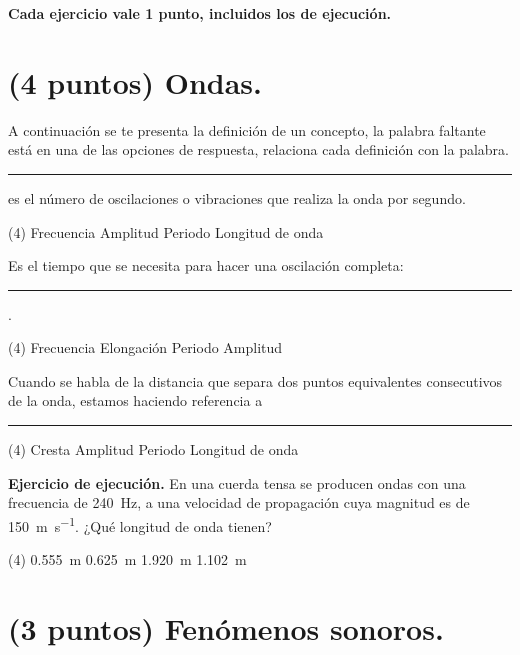 \documentclass[12pt, letter]{exam}
\begin{document}

\setcounter{page}{3}

\newpage
\begin{center}
\textbf{Cada ejercicio vale 1 punto, incluidos los de ejecución.}
\end{center}

\begin{questions}

    \section{(4 puntos) Ondas.}
    
    \vbox{\leftskip\leftmargin A continuación se te presenta la definición de un concepto, la palabra faltante está en una de las opciones de respuesta, relaciona cada definición con la palabra.}

    \question \rule{2cm}{0.1mm} es el número de oscilaciones o vibraciones que realiza la onda por segundo.
    \begin{tasks}(4)
        \task Frecuencia
        \task Amplitud
        \task Periodo
        \task Longitud de onda
    \end{tasks}
    \question Es el tiempo que se necesita para hacer una oscilación completa: \rule{2cm}{0.1mm}. 
    \begin{tasks}(4)
        \task Frecuencia
        \task Elongación
        \task Periodo
        \task Amplitud
    \end{tasks}
    \question Cuando se habla de la distancia que separa dos puntos equivalentes consecutivos de la onda, estamos haciendo referencia a \rule{2cm}{0.1mm} 
    \begin{tasks}(4)
        \task Cresta
        \task Amplitud
        \task Periodo
        \task Longitud de onda
    \end{tasks}
    \question \label{Ejercicio_01} \textbf{Ejercicio de ejecución.} En una cuerda tensa se producen ondas con una frecuencia de \SI{240}{\hertz}, a una velocidad de propagación cuya magnitud es de \SI{150}{\meter\per\second}. ¿Qué longitud de onda tienen?
    \begin{tasks}(4)
        \task \SI{0.555}{\meter}
        \task \SI{0.625}{\meter}
        \task \SI{1.920}{\meter}
        \task \SI{1.102}{\meter}
    \end{tasks}
    
    \section{(3 puntos) Fenómenos sonoros.}


\end{questions}
\end{document}
